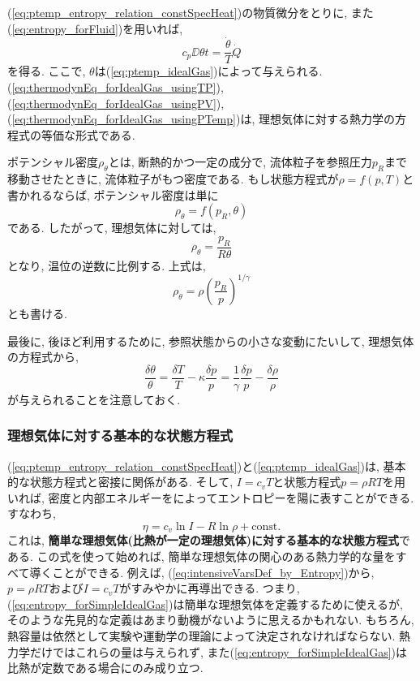 (\ref{eq:ptemp_entropy_relation_constSpecHeat})の物質微分をとりに, 
また(\ref{eq:entropy_forFluid})を用いれば, 
\begin{equation}
 \boxed{
  c_p \DD{\theta}{t} = \dfrac{\dot{\theta}}{T} \dot{Q}
 }
  \label{eq:thermodynEq_forIdealGas_usingPTemp}
\end{equation}
を得る. 
ここで, $\theta$は(\ref{eq:ptemp_idealGas})によって与えられる. 
(\ref{eq:thermodynEq_forIdealGas_usingTP}), 
(\ref{eq:thermodynEq_forIdealGas_usingPV}), 
(\ref{eq:thermodynEq_forIdealGas_usingPTemp})は, 理想気体に対する熱力学の方程式の等価な形式である. 

ポテンシャル密度$\rho_\theta$とは, 断熱的かつ一定の成分で, 流体粒子を参照圧力$p_R$まで移動させたときに, 
流体粒子がもつ密度である. 
もし状態方程式が$\rho = f(p,T)$と書かれるならば, ポテンシャル密度は単に
\begin{equation}
 \rho_\theta = f(p_R,\theta)
\end{equation}
である. 
したがって, 理想気体に対しては, 
\begin{equation}
 \rho_\theta = \dfrac{p_R}{R \theta}
\end{equation}
となり, 温位の逆数に比例する. 
上式は, 
\begin{equation}
 \rho_\theta = \rho \left(\dfrac{p_R}{p}\right)^{1/\gamma}
\end{equation}
とも書ける. 

最後に, 後ほど利用するために, 参照状態からの小さな変動にたいして, 
理想気体の方程式から, 
\begin{equation}
 \dfrac{\delta \theta}{\theta} 
   = \dfrac{\delta T}{T} - \kappa \dfrac{\delta p}{p}
   = \dfrac{1}{\gamma}\dfrac{\delta p}{p} - \dfrac{\delta \rho}{\rho}
\end{equation}
が与えられることを注意しておく.

\subsubsection*{理想気体に対する基本的な状態方程式}
(\ref{eq:ptemp_entropy_relation_constSpecHeat})と(\ref{eq:ptemp_idealGas})は, 基本的な状態方程式と密接に関係がある. 
そして, $I=c_v T$と状態方程式$p=\rho R T$を用いれば, 密度と内部エネルギーをによってエントロピーを陽に表すことができる. 
すなわち, 
\begin{equation}
 \boxed{
  \eta = c_v \ln I - R \ln \rho + \text{const}
 }.
\label{eq:entropy_forSimpleIdealGas}
\end{equation}
これは, \textbf{簡単な理想気体(比熱が一定の理想気体)に対する基本的な状態方程式}である. 
この式を使って始めれば, 簡単な理想気体の関心のある熱力学的な量をすべて導くことができる. 
例えば, (\ref{eq:intensiveVarsDef_by_Entropy})から, 
$p=\rho R T$および$I=c_v T$がすみやかに再導出できる. 
つまり, (\ref{eq:entropy_forSimpleIdealGas})は簡単な理想気体を定義するために使えるが, 
そのような先見的な定義はあまり動機がないように思えるかもれない. 
もちろん, 熱容量は依然として実験や運動学の理論によって決定されなければならない. 
熱力学だけではこれらの量は与えられず, 
また(\ref{eq:entropy_forSimpleIdealGas})は比熱が定数である場合にのみ成り立つ. 

